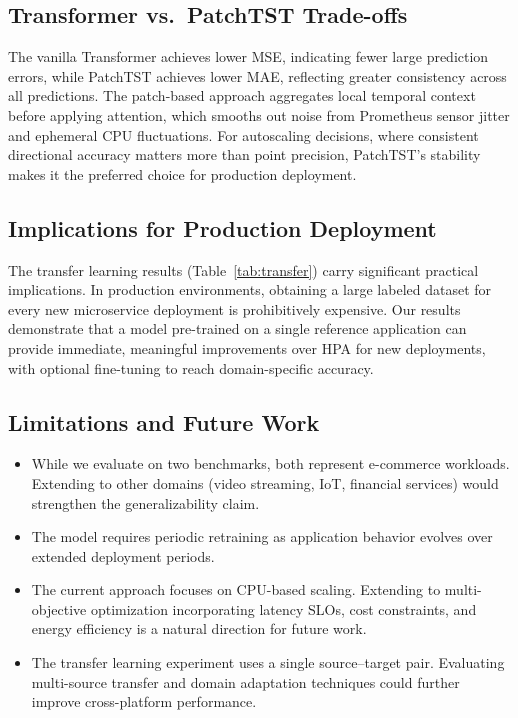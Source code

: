 \documentclass[conference]{IEEEtran}
\begin{document}
\subsection{Transformer vs.\ PatchTST Trade-offs}
The vanilla Transformer achieves lower MSE, indicating fewer large prediction errors, while PatchTST achieves lower MAE, reflecting greater consistency across all predictions. The patch-based approach aggregates local temporal context before applying attention, which smooths out noise from Prometheus sensor jitter and ephemeral CPU fluctuations. For autoscaling decisions, where consistent directional accuracy matters more than point precision, PatchTST's stability makes it the preferred choice for production deployment.

\subsection{Implications for Production Deployment}
The transfer learning results (Table~\ref{tab:transfer}) carry significant practical implications. In production environments, obtaining a large labeled dataset for every new microservice deployment is prohibitively expensive. Our results demonstrate that a model pre-trained on a single reference application can provide immediate, meaningful improvements over HPA for new deployments, with optional fine-tuning to reach domain-specific accuracy.

\subsection{Limitations and Future Work}
\begin{itemize}
    \item While we evaluate on two benchmarks, both represent e-commerce workloads. Extending to other domains (video streaming, IoT, financial services) would strengthen the generalizability claim.
    \item The model requires periodic retraining as application behavior evolves over extended deployment periods.
    \item The current approach focuses on CPU-based scaling. Extending to multi-objective optimization incorporating latency SLOs, cost constraints, and energy efficiency is a natural direction for future work.
    \item The transfer learning experiment uses a single source--target pair. Evaluating multi-source transfer and domain adaptation techniques could further improve cross-platform performance.
\end{itemize}
\end{document}
